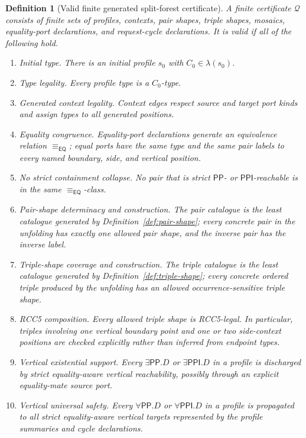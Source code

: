 \documentclass[11pt]{article}
\newtheorem{definition}[theorem]{Definition}
\newcommand{\EQ}{\mathsf{EQ}}
\newcommand{\PP}{\mathsf{PP}}
\newcommand{\PPI}{\mathsf{PPI}}
\newcommand{\Q}{\mathcal Q}
\newcommand{\eqc}{\equiv_{\EQ}}
\begin{document}
\begin{definition}[Valid finite generated split-forest certificate]\label{def:valid-certificate}
A finite certificate $\Q$ consists of finite sets of profiles, contexts, pair shapes, triple shapes, mosaics, equality-port declarations, and request-cycle declarations.  It is valid if all of the following hold.
\begin{enumerate}[label=(V\arabic*)]
\item \emph{Initial type.}  There is an initial profile $s_0$ with $C_0\in\lambda(s_0)$.
\item \emph{Type legality.}  Every profile type is a $C_0$-type.
\item \emph{Generated context legality.}  Context edges respect source and target port kinds and assign types to all generated positions.
\item \emph{Equality congruence.}  Equality-port declarations generate an equivalence relation $\eqc$; equal ports have the same type and the same pair labels to every named boundary, side, and vertical position.
\item \emph{No strict containment collapse.}  No pair that is strict $\PP$- or $\PPI$-reachable is in the same $\eqc$-class.
\item \emph{Pair-shape determinacy and construction.}  The pair catalogue is the least catalogue generated by Definition~\ref{def:pair-shape}; every concrete pair in the unfolding has exactly one allowed pair shape, and the inverse pair has the inverse label.
\item \emph{Triple-shape coverage and construction.}  The triple catalogue is the least catalogue generated by Definition~\ref{def:triple-shape}; every concrete ordered triple produced by the unfolding has an allowed occurrence-sensitive triple shape.
\item \emph{RCC5 composition.}  Every allowed triple shape is RCC5-legal.  In particular, triples involving one vertical boundary point and one or two side-context positions are checked explicitly rather than inferred from endpoint types.
\item \emph{Vertical existential support.}  Every $\exists\PP.D$ or $\exists\PPI.D$ in a profile is discharged by strict equality-aware vertical reachability, possibly through an explicit equality-mate source port.
\item \emph{Vertical universal safety.}  Every $\forall\PP.D$ or $\forall\PPI.D$ in a profile is propagated to all strict equality-aware vertical targets represented by the profile summaries and cycle declarations.

\end{enumerate}
\end{definition}
\end{document}
